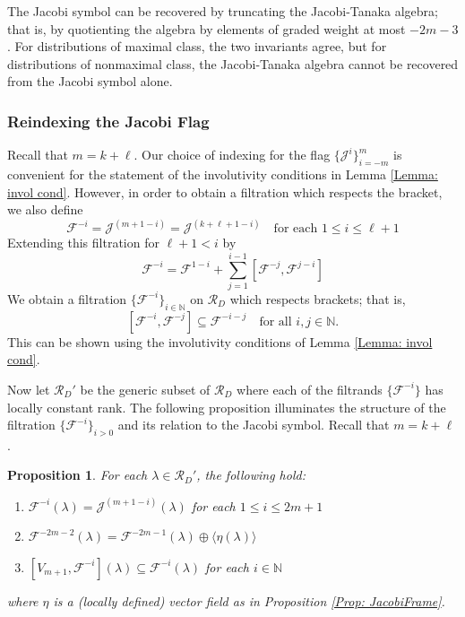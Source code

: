 \documentclass[11pt,letterpaper]{amsart}
\newtheorem{prop}[theorem]{Proposition}
\numberwithin{equation}{section}
\begin{document}
The Jacobi symbol can be recovered by truncating the Jacobi-Tanaka algebra; that is, by quotienting the algebra by elements of graded weight at most $-2m-3$. For distributions of maximal class, the two invariants agree, but for distributions of nonmaximal class, the Jacobi-Tanaka algebra cannot be recovered from the Jacobi symbol alone.

\subsubsection{Reindexing the Jacobi Flag}
Recall that $m=k+\ell$. Our choice of indexing for the flag $\{\mathcal{J}^{i}\}_{i=-m}^m$ is convenient for the statement of the involutivity conditions in Lemma \ref{Lemma: invol cond}. However, in order to obtain a filtration which respects the bracket, we also define
\begin{equation}
    \label{F def 1}
    \mathcal{F}^{-i} = \mathcal{J}^{(m+1-i)} = \mathcal{J}^{(k+\ell+1-i)}\quad\text{for each }1\leq i \leq \ell+1
\end{equation}
Extending this filtration for $\ell+1<i$ by
\begin{equation}
    \label{F def 2}
    \mathcal{F}^{-i} = \mathcal{F}^{1-i}+\sum_{j=1}^{i-1} [\mathcal{F}^{-j},\mathcal{F}^{j-i}]
\end{equation}
We obtain a filtration $\{\mathcal{F}^{-i}\}_{i\in \mathbb{N}}$ on $\mathcal{R}_D$ which respects brackets; that is,
\begin{equation}
    \label{bracket-resp cond}
    [\mathcal{F}^{-i},\mathcal{F}^{-j}]\subseteq \mathcal{F}^{-i-j}\quad\text{for all }i,j\in \mathbb{N}.
\end{equation}
This can be shown using the involutivity conditions of Lemma \ref{Lemma: invol cond}.

Now let $\mathcal{R}_D'$ be the generic subset of $\mathcal{R}_D$ where each of the filtrands $\{\mathcal{F}^{-i}\}$ has locally constant rank. The following proposition illuminates the structure of the filtration $\{\mathcal F^{-i}\}_{i>0}$ and its relation to the Jacobi symbol. Recall that $m = k+ \ell$.
\begin{prop}
    \label{Prop: Technical}
    For each $\lambda\in\mathcal R_D'$, the following hold:
    \begin{enumerate}[label=(\roman*)]
        \item $\mathcal{F}^{-i}(\lambda) = \mathcal{J}^{(m+1-i)}(\lambda)$ for each $1\leq i\leq 2m+1$
        \item $\mathcal{F}^{-2m-2}(\lambda) = \mathcal{F}^{-2m-1}(\lambda)\oplus \big\langle \eta(\lambda)\big\rangle$
        \item $[V_{m+1},\mathcal{F}^{-i}](\lambda)\subseteq \mathcal{F}^{-i}(\lambda)$ for each $i\in\mathbb N$
    \end{enumerate}
    where $\eta$ is a (locally defined) vector field as in Proposition \ref{Prop: JacobiFrame}.
\end{prop}
\end{document}
